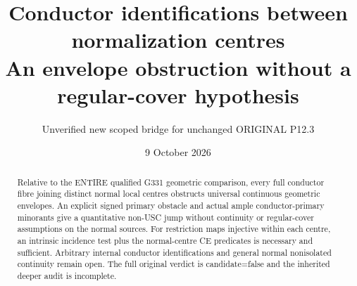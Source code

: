 \documentclass[11pt]{article}
\title{Conductor identifications between normalization centres\\
An envelope obstruction without a regular-cover hypothesis}
\author{Unverified new scoped bridge for unchanged ORIGINAL P12.3}
\date{9 October 2026}
\begin{document}
\maketitle
\begin{abstract}
Relative to the ENTIRE qualified G331 geometric comparison, every full
conductor fibre joining distinct normal local centres obstructs universal
continuous geometric envelopes. An explicit signed primary obstacle and
actual ample conductor-primary minorants give a quantitative non-USC jump
without continuity or regular-cover assumptions on the normal sources.
For restriction maps injective within each centre, an intrinsic incidence
test plus the normal-centre CE predicates is necessary and sufficient.
Arbitrary internal conductor identifications and general normal
nonisolated continuity remain open. The full original verdict is
candidate=false and the inherited deeper audit is incomplete.
\end{abstract}
\tableofcontents
\end{document}
